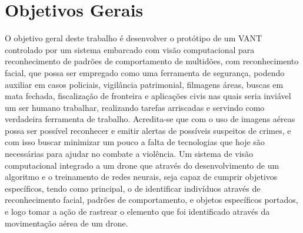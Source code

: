 \section{Objetivos Gerais}
O objetivo geral deste trabalho é desenvolver o protótipo de um VANT controlado por um sistema embarcado com visão computacional para reconhecimento de padrões de comportamento de multidões, com reconhecimento facial, que possa ser empregado como uma ferramenta de segurança, podendo auxiliar em casos policiais, vigilância patrimonial, filmagens áreas, buscas em mata fechada, fiscalização de fronteira e aplicações civis nas quais seria inviável um ser humano trabalhar, realizando tarefas arriscadas e servindo como verdadeira ferramenta de trabalho.
Acredita-se que com o uso de imagens aéreas possa ser possível reconhecer e emitir alertas de possíveis suspeitos de crimes, e com isso buscar minimizar um pouco a falta de tecnologias que hoje são necessárias para ajudar no combate a violência. 
Um sistema de visão computacional integrado a um drone que através do desenvolvimento de um algoritmo e o treinamento de redes neurais, seja capaz de cumprir objetivos específicos, tendo como principal, o de identificar indivíduos através de reconhecimento facial, padrões de comportamento, e objetos específicos portados, e logo tomar a ação de rastrear o elemento que foi identificado através da movimentação aérea de um drone.   




